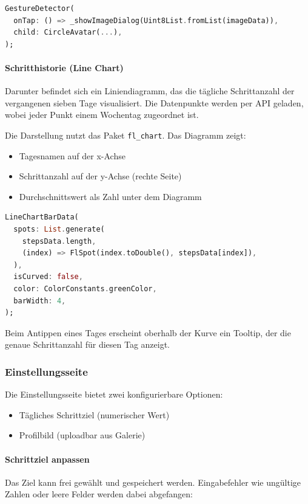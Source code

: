 \documentclass[11pt,a4paper]{article}
\begin{document}
\begin{lstlisting}[language=Dart, caption=Bild als Dialog anzeigen]
GestureDetector(
  onTap: () => _showImageDialog(Uint8List.fromList(imageData)),
  child: CircleAvatar(...),
);
\end{lstlisting}

\paragraph{Schritthistorie (Line Chart)}
Darunter befindet sich ein Liniendiagramm, das die tägliche Schrittanzahl der vergangenen sieben Tage visualisiert. Die Datenpunkte werden per API geladen, wobei jeder Punkt einem Wochentag zugeordnet ist.

Die Darstellung nutzt das Paket \texttt{fl\_chart}. Das Diagramm zeigt:
\begin{itemize}
  \item Tagesnamen auf der x-Achse
  \item Schrittanzahl auf der y-Achse (rechte Seite)
  \item Durchschnittswert als Zahl unter dem Diagramm
\end{itemize}

\begin{lstlisting}[language=Dart, caption=Diagrammkonfiguration für Schrittverlauf]
LineChartBarData(
  spots: List.generate(
    stepsData.length,
    (index) => FlSpot(index.toDouble(), stepsData[index]),
  ),
  isCurved: false,
  color: ColorConstants.greenColor,
  barWidth: 4,
);
\end{lstlisting}

Beim Antippen eines Tages erscheint oberhalb der Kurve ein Tooltip, der die genaue Schrittanzahl für diesen Tag anzeigt.

\subsubsection{Einstellungsseite}

Die Einstellungsseite bietet zwei konfigurierbare Optionen:
\begin{itemize}
  \item Tägliches Schrittziel (numerischer Wert)
  \item Profilbild (uploadbar aus Galerie)
\end{itemize}

\paragraph{Schrittziel anpassen}
Das Ziel kann frei gewählt und gespeichert werden. Eingabefehler wie ungültige Zahlen oder leere Felder werden dabei abgefangen:
\end{document}

